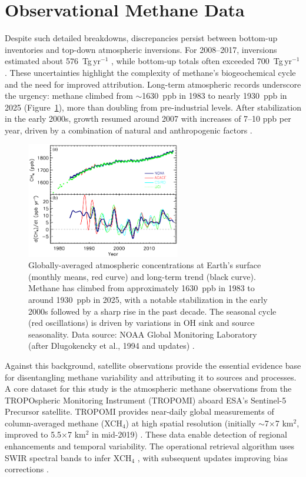 \section{Observational Methane Data}
\label{sec:methane_atmosphere}

Despite such detailed breakdowns, discrepancies persist between bottom-up inventories and top-down atmospheric inversions. For 2008--2017, inversions estimated about 576~Tg\,yr$^{-1}$ \cite{Saunois2020}, while bottom-up totals often exceeded 700~Tg\,yr$^{-1}$. These uncertainties highlight the complexity of methane's biogeochemical cycle and the need for improved attribution. Long-term atmospheric records underscore the urgency: methane climbed from $\sim$1630~ppb in 1983 to nearly 1930~ppb in 2025 (Figure~\ref{fig:ch4_global_trend}), more than doubling from pre-industrial levels. After stabilization in the early 2000s, growth resumed around 2007 with increases of 7--10 ppb per year, driven by a combination of natural and anthropogenic factors \cite{Shindell2012, Karoff2023}.

\begin{figure}[h]
	\centering
	\includegraphics[width=0.6\textwidth]{Images/ch4_trend.png}
	\caption[Global  trends from 1983 to 2025]{Globally-averaged atmospheric  concentrations at Earth's surface (monthly means, red curve) and long-term trend (black curve). Methane has climbed from approximately 1630~ppb in 1983 to around 1930~ppb in 2025, with a notable stabilization in the early 2000s followed by a sharp rise in the past decade. The seasonal cycle (red oscillations) is driven by variations in OH sink and source seasonality. Data source: NOAA Global Monitoring Laboratory (after Dlugokencky et al., 1994 and updates) \cite{Saunois2020}.}
	\label{fig:ch4_global_trend}
\end{figure}

Against this background, satellite observations provide the essential evidence base for disentangling methane variability and attributing it to sources and processes. A core dataset for this study is the atmospheric methane observations from the TROPOspheric Monitoring Instrument (TROPOMI) aboard ESA's Sentinel-5 Precursor satellite. TROPOMI provides near-daily global measurements of column-averaged methane (XCH$_4$) at high spatial resolution (initially $\sim$7$\times$7 km$^2$, improved to 5.5$\times$7 km$^2$ in mid-2019) \cite{Hu2016, Lorente2021}. These data enable detection of regional enhancements and temporal variability. The operational retrieval algorithm uses SWIR spectral bands to infer XCH$_4$ \cite{Hu2016}, with subsequent updates improving bias corrections \cite{Lorente2021}.


